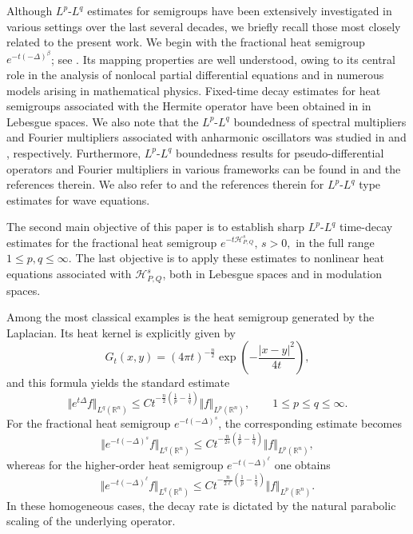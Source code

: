 \documentclass[12pt, reqno]{amsart}
\theoremstyle{definition}
\theoremstyle{remark}
\numberwithin{equation}{section}
\begin{document}
Although $L^p$-$L^q$ estimates for semigroups have been extensively investigated in various settings over the last several decades, we briefly recall those most closely related to the present work. We begin with the fractional heat semigroup $e^{-t(-\Delta)^\beta}$; see \cite{MY, PV, We}. Its mapping properties are well understood, owing to its central role in the analysis of nonlocal partial differential equations and in numerous models arising in mathematical physics. Fixed-time decay estimates for heat semigroups associated with the Hermite operator have been obtained in \cite{than:hs1} in Lebesgue spaces. We also note that the $L^p$-$L^q$ boundedness of spectral multipliers and Fourier multipliers associated with anharmonic oscillators was studied in \cite{CK} and \cite{CK23}, respectively. Furthermore, $L^p$-$L^q$ boundedness results for pseudo-differential operators and Fourier multipliers in various frameworks can be found in \cite{CKRT20, CKR23, CDKR23, RT24, ANR19, AR19, KumarPA25, KR23} and the references therein. We also refer to \cite{TS, Bre, Nis, SRR,Jia} and the references therein for $L^p$-$L^q$ type estimates for wave equations.

The second main objective of this paper is to establish sharp $L^p$-$L^q$ time-decay estimates for the fractional heat semigroup $e^{-t\mathcal{H}_{P,Q}^{s}},
\, s>0,$
in the full range $1\leq p,q\leq\infty$. The last objective is to apply these estimates to nonlinear heat equations associated with $\mathcal{H}_{P,Q}^s$, both in Lebesgue spaces and in modulation spaces.


Among the most classical examples is the heat semigroup generated by the Laplacian. Its heat kernel is explicitly given by
\[
G_t(x,y)
=
(4\pi t)^{-\frac n2}
\exp\left(-\frac{|x-y|^2}{4t}\right),
\]
and this formula yields the standard estimate
\[
\Vert e^{t\Delta}f\Vert_{L^q(\mathbb{R}^n)}
\leq
C t^{-\frac n2(\frac1p-\frac1q)}
\Vert f\Vert_{L^p(\mathbb{R}^n)},
\qquad
1\leq p\leq q\leq\infty.
\]
For the fractional heat semigroup $e^{-t(-\Delta)^s}$, the corresponding estimate becomes
\[
\Vert e^{-t(-\Delta)^s}f\Vert_{L^q(\mathbb{R}^n)}
\leq
C t^{-\frac n{2s}(\frac1p-\frac1q)}
\Vert f\Vert_{L^p(\mathbb{R}^n)},
\]
whereas for the higher-order heat semigroup $e^{-t(-\Delta)^\ell}$ one obtains
\[
\Vert e^{-t(-\Delta)^\ell}f\Vert_{L^q(\mathbb{R}^n)}
\leq
C t^{-\frac n{2\ell}(\frac1p-\frac1q)}
\Vert f\Vert_{L^p(\mathbb{R}^n)}.
\]
In these homogeneous cases, the decay rate is dictated by the natural parabolic scaling of the underlying operator.
\end{document}
